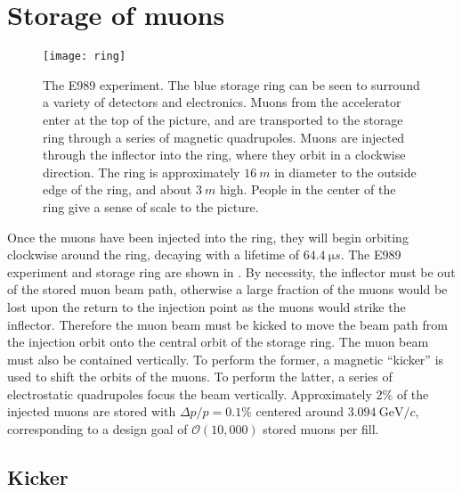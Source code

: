 \section{Storage of muons}
\label{sec:Storage}

\begin{figure}
    \centering
    \texttt{[image: ring]}
    \caption[The E989 experiment]{The E989 experiment. The blue storage ring can be seen to surround a variety of detectors and electronics. Muons from the accelerator enter at the top of the picture, and are transported to the storage ring through a series of magnetic quadrupoles. Muons are injected through the inflector into the ring, where they orbit in a clockwise direction. The ring is approximately $\SI{16}{m}$ in diameter to the outside edge of the ring, and about $\SI{3}{m}$ high. People in the center of the ring give a sense of scale to the picture.}
    \label{fig:ring}
\end{figure}


Once the muons have been injected into the ring, they will begin orbiting clockwise around the ring, decaying with a lifetime of $\SI{64.4}{\micro s}$.  The E989 experiment and storage ring are shown in . By necessity, the inflector must be out of the stored muon beam path, otherwise a large fraction of the muons would be lost upon the return to the injection point as the muons would strike the inflector. Therefore the muon beam must be kicked to move the beam path from the injection orbit onto the central orbit of the storage ring. The muon beam must also be contained vertically. To perform the former, a magnetic ``kicker'' is used to shift the orbits of the muons. To perform the latter, a series of electrostatic quadrupoles focus the beam vertically. Approximately 2\% of the injected muons are stored with $\Delta p / p = 0.1\%$ centered around $\SI{3.094}{\GeV/c}$, corresponding to a design goal of $\mathcal{O}(10,000)$ stored muons per fill.


\subsection{Kicker}
\label{sub:kicker}

